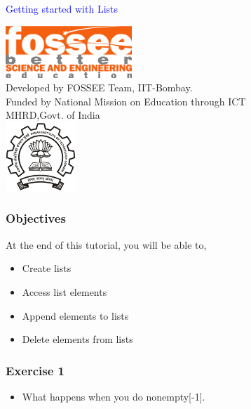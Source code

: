 \documentclass[presentation]{beamer}
\title{}
\author{FOSSEE}
\date{2010-09-14 Tue}
\begin{document}
\begin{frame}

\begin{center}
\vspace{12pt}
\textcolor{blue}{\huge Getting started with Lists}
\end{center}
\vspace{18pt}
\begin{center}
\vspace{10pt}
\includegraphics[scale=0.95]{../images/fossee-logo.png}\\
\vspace{5pt}
\scriptsize Developed by FOSSEE Team, IIT-Bombay. \\ 
\scriptsize Funded by National Mission on Education through ICT\\
\scriptsize  MHRD,Govt. of India\\
\includegraphics[scale=0.30]{../images/iitb-logo.png}\\
\end{center}
\end{frame}
\begin{frame}
\frametitle{Objectives}
\label{sec-2}

  At the end of this tutorial, you will be able to, 

\begin{itemize}
\item Create lists
\item Access list elements
\item Append elements to lists
\item Delete elements from lists
\end{itemize}
\end{frame}
\begin{frame}
\frametitle{Exercise 1}
\label{sec-3}


\begin{itemize}
\item What happens when you do nonempty[-1].
\end{itemize}
\end{frame}
\end{document}
